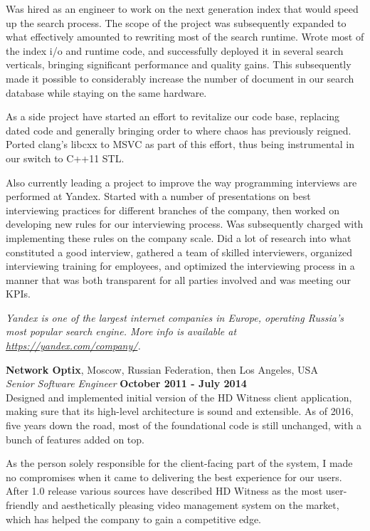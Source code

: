 \documentclass[margin,line]{CV}
\def\superofficial{}
\begin{document}
\begin{resume}
    Was hired as an engineer to work on the next generation index that would speed up the search process. The scope of the project was subsequently expanded to what effectively amounted to rewriting most of the search runtime. Wrote most of the index i/o and runtime code, and successfully deployed it in several search verticals, bringing significant performance and quality gains. This subsequently made it possible to considerably increase the number of document in our search database while staying on the same hardware.
    
    As a side project have started an effort to revitalize our code base, replacing dated code and generally bringing order to where chaos has previously reigned. Ported clang's libcxx to MSVC as part of this effort, thus being instrumental in our switch to C++11 STL.

    Also currently leading a project to improve the way programming interviews are performed at Yandex. Started with a number of presentations on best interviewing practices for different branches of the company, then worked on developing new rules for our interviewing process. Was subsequently charged with implementing these rules on the company scale. Did a lot of research into what constituted a good interview, gathered a team of skilled interviewers, organized interviewing training for employees, and optimized the interviewing process in a manner that was both transparent for all parties involved and was meeting our KPIs.
    
    
\ifdefined\superofficial
    {\footnotesize\textit{Yandex is one of the largest internet companies in Europe, operating Russia's most popular search engine. More info is available at \url{https://yandex.com/company/}.}}
\fi 

    
    \textbf{Network Optix}, Moscow, Russian Federation, then Los Angeles, USA \vspace{2mm}\\\vspace{1mm}%
    \textsl{Senior Software Engineer} \hfill \textbf{October 2011 - July 2014}\\ 
    Designed and implemented initial version of the HD Witness client application, making sure that its high-level architecture is sound and extensible. As of 2016, five years down the road, most of the foundational code is still unchanged, with a bunch of features added on top.

    As the person solely responsible for the client-facing part of the system, I made no compromises when it came to delivering the best experience for our users. After 1.0 release various sources have described HD Witness as the most user-friendly and aesthetically pleasing video management system on the market, which has helped the company to gain a competitive edge.


\end{resume}
\end{document}
